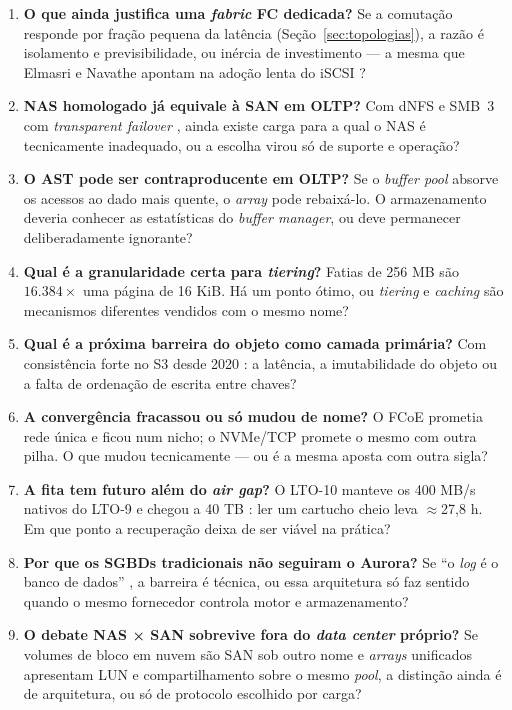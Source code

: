 \documentclass[11pt,a4paper]{article}
\begin{document}
\begin{enumerate}[leftmargin=0.7cm,itemsep=2pt]
\item \textbf{O que ainda justifica uma \textit{fabric} FC dedicada?} Se a comutação responde por fração
pequena da latência (Seção~\ref{sec:topologias}), a razão é isolamento e previsibilidade, ou inércia de
investimento --- a mesma que Elmasri e Navathe apontam na adoção lenta do iSCSI \cite{elmasri2018}?
\item \textbf{NAS homologado já equivale à SAN em OLTP?} Com dNFS \cite{oracledn} e SMB~3 com
\textit{transparent failover} \cite{mssqlsmb}, ainda existe carga para a qual o NAS é tecnicamente
inadequado, ou a escolha virou só de suporte e operação?
\item \textbf{O AST pode ser contraproducente em OLTP?} Se o \textit{buffer pool} absorve os acessos ao dado
mais quente, o \textit{array} pode rebaixá-lo. O armazenamento deveria conhecer as estatísticas do
\textit{buffer manager}, ou deve permanecer deliberadamente ignorante?
\item \textbf{Qual é a granularidade certa para \textit{tiering}?} Fatias de 256 MB \cite{dellfast} são
$16.384\times$ uma página de 16 KiB. Há um ponto ótimo, ou \textit{tiering} e \textit{caching} são mecanismos
diferentes vendidos com o mesmo nome?
\item \textbf{Qual é a próxima barreira do objeto como camada primária?} Com consistência forte no S3 desde
2020 \cite{awss3news2020}: a latência, a imutabilidade do objeto ou a falta de ordenação de escrita entre
chaves?
\item \textbf{A convergência fracassou ou só mudou de nome?} O FCoE prometia rede única e ficou num nicho; o
NVMe/TCP promete o mesmo com outra pilha. O que mudou tecnicamente --- ou é a mesma aposta com outra sigla?
\item \textbf{A fita tem futuro além do \textit{air gap}?} O LTO-10 manteve os 400 MB/s nativos do LTO-9
\cite{blocksfiles2025} e chegou a 40 TB \cite{lto10}: ler um cartucho cheio leva $\approx$27,8 h. Em que ponto a
recuperação deixa de ser viável na prática?
\item \textbf{Por que os SGBDs tradicionais não seguiram o Aurora?} Se ``o \textit{log} é o banco de dados''
\cite{aurora2017}, a barreira é técnica, ou essa arquitetura só faz sentido quando o mesmo fornecedor controla
motor e armazenamento?
\item \textbf{O debate NAS × SAN sobrevive fora do \textit{data center} próprio?} Se volumes de bloco em nuvem
são SAN sob outro nome e \textit{arrays} unificados apresentam LUN e compartilhamento sobre o mesmo
\textit{pool}, a distinção ainda é de arquitetura, ou só de protocolo escolhido por carga?
\end{enumerate}
\end{document}
